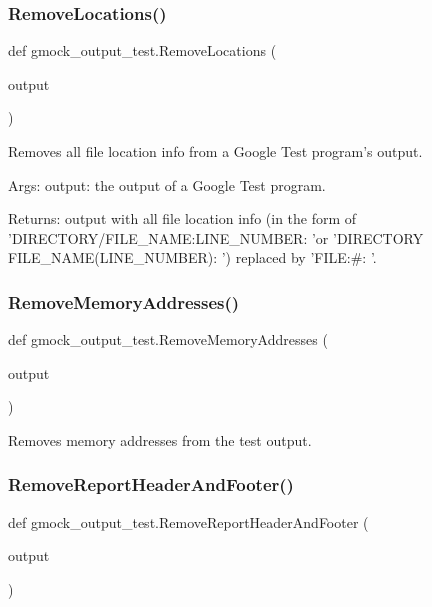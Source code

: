 \subsubsection{\texorpdfstring{RemoveLocations()}{RemoveLocations()}}
{\footnotesize\ttfamily def gmock\+\_\+output\+\_\+test.\+Remove\+Locations (\begin{DoxyParamCaption}\item[{}]{output }\end{DoxyParamCaption})}

\begin{DoxyVerb}Removes all file location info from a Google Test program's output.

Args:
     output:  the output of a Google Test program.

Returns:
     output with all file location info (in the form of
     'DIRECTORY/FILE_NAME:LINE_NUMBER: 'or
     'DIRECTORY\\FILE_NAME(LINE_NUMBER): ') replaced by
     'FILE:#: '.
\end{DoxyVerb}
 \mbox{\label{namespacegmock__output__test_a58b4fdb82b40d01d32b09d4c14ba11a5}} 
\subsubsection{\texorpdfstring{RemoveMemoryAddresses()}{RemoveMemoryAddresses()}}
{\footnotesize\ttfamily def gmock\+\_\+output\+\_\+test.\+Remove\+Memory\+Addresses (\begin{DoxyParamCaption}\item[{}]{output }\end{DoxyParamCaption})}

\begin{DoxyVerb}Removes memory addresses from the test output.\end{DoxyVerb}
 \mbox{\label{namespacegmock__output__test_a2ebfc0abfb0ed307021ecaa9da465c55}} 
\subsubsection{\texorpdfstring{RemoveReportHeaderAndFooter()}{RemoveReportHeaderAndFooter()}}
{\footnotesize\ttfamily def gmock\+\_\+output\+\_\+test.\+Remove\+Report\+Header\+And\+Footer (\begin{DoxyParamCaption}\item[{}]{output }\end{DoxyParamCaption})}

